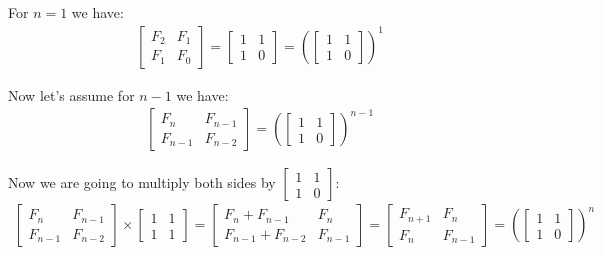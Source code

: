 \documentclass[12pt]{article}
\begin{document}
For $n=1$ we have:
\begin{gather*}
    \begin{bmatrix}
        F_{2} & F_{1} \\
        F_{1} & F_{0}
    \end{bmatrix}
    =
    \begin{bmatrix}
        1 & 1 \\
        1 & 0
    \end{bmatrix}
    =
    \left(\begin{bmatrix}
        1 & 1 \\
        1 & 0
    \end{bmatrix}\right)^1
\end{gather*}

Now let's assume for $n-1$ we have:
\begin{gather*}
    \begin{bmatrix}
        F_{n} & F_{n-1} \\
        F_{n-1} & F_{n-2}
    \end{bmatrix}
    =
    \left(\begin{bmatrix}
    1 & 1 \\
    1 & 0
    \end{bmatrix}\right)^{n-1}
\end{gather*}

Now we are going to multiply both sides by \( \begin{bmatrix} 1 & 1 \\ 1 & 0 \end{bmatrix} \):
\begin{gather*}
    \begin{bmatrix}
        F_{n} & F_{n-1} \\
        F_{n-1} & F_{n-2}
    \end{bmatrix}
    \times
    \begin{bmatrix}
        1 & 1 \\
        1 & 1
    \end{bmatrix}
    =
    \begin{bmatrix}
        F_{n}+F_{n-1} & F_{n} \\
        F_{n-1}+F_{n-2} & F_{n-1}
    \end{bmatrix}
    =
    \begin{bmatrix}
        F_{n+1} & F_{n} \\
        F_{n} & F_{n-1}
    \end{bmatrix}
    =
    \left(\begin{bmatrix}
    1 & 1 \\
    1 & 0
    \end{bmatrix}\right)^{n}
\end{gather*}
\end{document}
